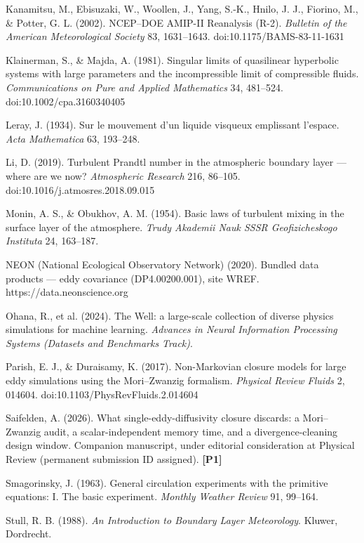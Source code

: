 \documentclass[aps,prfluids,preprint,superscriptaddress,nofootinbib]{revtex4-2}
\begin{document}
Kanamitsu, M., Ebisuzaki, W., Woollen, J., Yang, S.-K., Hnilo, J. J., Fiorino, M., \& Potter, G. L. (2002). NCEP--DOE AMIP-II Reanalysis (R-2). \emph{Bulletin of the American Meteorological Society} 83, 1631--1643. doi:10.1175/BAMS-83-11-1631

Klainerman, S., \& Majda, A. (1981). Singular limits of quasilinear hyperbolic systems with large parameters and the incompressible limit of compressible fluids. \emph{Communications on Pure and Applied Mathematics} 34, 481--524. doi:10.1002/cpa.3160340405

Leray, J. (1934). Sur le mouvement d'un liquide visqueux emplissant l'espace. \emph{Acta Mathematica} 63, 193--248.

Li, D. (2019). Turbulent Prandtl number in the atmospheric boundary layer --- where are we now? \emph{Atmospheric Research} 216, 86--105. doi:10.1016/j.atmosres.2018.09.015

Monin, A. S., \& Obukhov, A. M. (1954). Basic laws of turbulent mixing in the surface layer of the atmosphere. \emph{Trudy Akademii Nauk SSSR Geofizicheskogo Instituta} 24, 163--187.

NEON (National Ecological Observatory Network) (2020). Bundled data products --- eddy covariance (DP4.00200.001), site WREF. https://data.neonscience.org

Ohana, R., et al. (2024). The Well: a large-scale collection of diverse physics simulations for machine learning. \emph{Advances in Neural Information Processing Systems (Datasets and Benchmarks Track)}.

Parish, E. J., \& Duraisamy, K. (2017). Non-Markovian closure models for large eddy simulations using the Mori--Zwanzig formalism. \emph{Physical Review Fluids} 2, 014604. doi:10.1103/PhysRevFluids.2.014604

Saifelden, A. (2026). What single-eddy-diffusivity closure discards: a Mori--Zwanzig audit, a scalar-independent memory time, and a divergence-cleaning design window. Companion manuscript, under editorial consideration at Physical Review (permanent submission ID assigned). \textbf{[P1]}

Smagorinsky, J. (1963). General circulation experiments with the primitive equations: I. The basic experiment. \emph{Monthly Weather Review} 91, 99--164.

Stull, R. B. (1988). \emph{An Introduction to Boundary Layer Meteorology}. Kluwer, Dordrecht.
\end{document}
